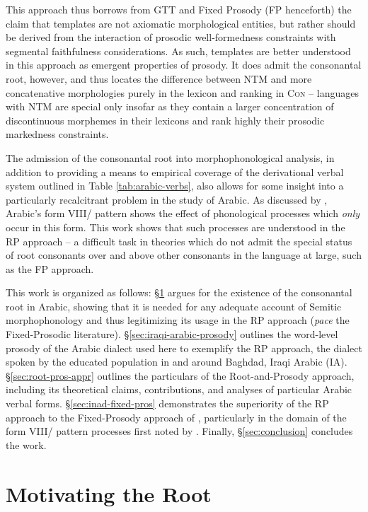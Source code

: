 \documentclass[12pt,twoside,letterpaper]{article}
\begin{document}
This approach thus borrows from GTT and Fixed Prosody (FP henceforth) the claim that templates are not axiomatic morphological entities, but rather should be derived from the interaction of prosodic well-formedness constraints with segmental faithfulness considerations. As such, templates are better understood in this approach as emergent properties of prosody. It does admit the consonantal root, however, and thus locates the difference between NTM and more concatenative morphologies purely in the lexicon and ranking in \textsc{Con} -- languages with NTM are special only insofar as they contain a larger concentration of discontinuous morphemes in their lexicons and rank highly their prosodic markedness constraints.

The admission of the consonantal root into morphophonological analysis, in addition to providing a means to empirical coverage of the derivational verbal system outlined in Table \ref{tab:arabic-verbs}, also allows for some insight into a particularly recalcitrant problem in the study of Arabic. As discussed by \cite{mccarthy79,mccarthy81}, Arabic's form VIII/{\em {}} pattern shows the effect of phonological processes which \emph{only} occur in this form. This work shows that such processes are understood in the RP approach -- a difficult task in theories which do not admit the special status of root consonants over and above other consonants in the language at large, such as the FP approach.

This work is organized as follows: \S{\ref{sec:motivating-root}} argues for the existence of the consonantal root in Arabic, showing that it is needed for any adequate account of Semitic morphophonology and thus legitimizing its usage in the RP approach (\emph{pace} the Fixed-Prosodic literature). \S{\ref{sec:iraqi-arabic-prosody}} outlines the word-level prosody of the Arabic dialect used here to exemplify the RP approach, the dialect spoken by the educated population in and around Baghdad, Iraqi Arabic (IA). \S{\ref{sec:root-pros-appr}} outlines the particulars of the Root-and-Prosody approach, including its theoretical claims, contributions, and analyses of particular Arabic verbal forms. \S{\ref{sec:inad-fixed-pros}} demonstrates the superiority of the RP approach to the Fixed-Prosody approach of \cite{ussishkin00,ussishkin05}, particularly in the domain of the form VIII/{\em {}} pattern processes first noted by \cite{mccarthy79}. Finally, \S{\ref{sec:conclusion}} concludes the work. 

\section{Motivating the Root}
\label{sec:motivating-root}
\end{document}

